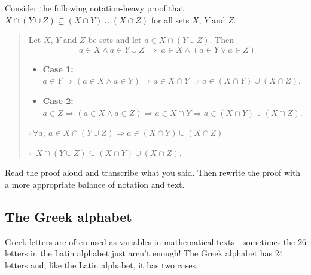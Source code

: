 \begin{exercise}
Consider the following notation-heavy proof that $X \cap (Y \cup Z) \subseteq (X \cap Y) \cup (X \cap Z)$ for all sets $X$, $Y$ and $Z$.
\begin{quote}
Let $X$, $Y$ and $Z$ be sets and let $a \in X \cap (Y \cup Z)$. Then
\[ a \in X \wedge a \in Y \cup Z ~ \Rightarrow ~ a \in X \wedge (a \in Y \vee a \in Z) \]
\begin{itemize}
\item \textbf{Case 1:} $a \in Y \Rightarrow (a \in X \wedge a \in Y) \Rightarrow a \in X \cap Y \Rightarrow a \in (X \cap Y) \cup (X \cap Z)$.
\item \textbf{Case 2:} $a \in Z \Rightarrow (a \in X \wedge a \in Z) \Rightarrow a \in X \cap Y \Rightarrow a \in (X \cap Y) \cup (X \cap Z)$.
\end{itemize}
$\therefore \forall a,~ a \in X \cap (Y \cup Z) \Rightarrow a \in (X \cap Y) \cup (X \cap Z)$

$\therefore$ $X \cap (Y \cup Z) \subseteq (X \cap Y) \cup (X \cap Z)$.
\end{quote}
Read the proof aloud and transcribe what you said. Then rewrite the proof with a more appropriate balance of notation and text.
\end{exercise}

%
%

\subsection*{The Greek alphabet}

Greek letters are often used as variables in mathematical texts---sometimes the 26 letters in the Latin alphabet just aren't enough! The Greek alphabet has 24 letters and, like the Latin alphabet, it has two cases.


